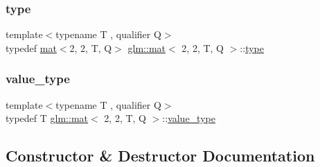 \mbox{\label{structglm_1_1mat_3_012_00_012_00_01_t_00_01_q_01_4_ac6dc94bb53f4e93c806d3b38cbf9172c}} 
\subsubsection{\texorpdfstring{type}{type}}
{\footnotesize\ttfamily template$<$typename T , qualifier Q$>$ \\
typedef \mbox{\hyperlink{structglm_1_1mat}{mat}}$<$2, 2, T, Q$>$ \mbox{\hyperlink{structglm_1_1mat}{glm\+::mat}}$<$ 2, 2, T, Q $>$\+::\mbox{\hyperlink{structglm_1_1mat_3_012_00_012_00_01_t_00_01_q_01_4_ac6dc94bb53f4e93c806d3b38cbf9172c}{type}}}

\mbox{\label{structglm_1_1mat_3_012_00_012_00_01_t_00_01_q_01_4_a6bd6b4c0d4bf7dff724cc03096b92d40}} 
\subsubsection{\texorpdfstring{value\+\_\+type}{value\_type}}
{\footnotesize\ttfamily template$<$typename T , qualifier Q$>$ \\
typedef T \mbox{\hyperlink{structglm_1_1mat}{glm\+::mat}}$<$ 2, 2, T, Q $>$\+::\mbox{\hyperlink{structglm_1_1mat_3_012_00_012_00_01_t_00_01_q_01_4_a6bd6b4c0d4bf7dff724cc03096b92d40}{value\+\_\+type}}}



\subsection{Constructor \& Destructor Documentation}
\mbox{\label{structglm_1_1mat_3_012_00_012_00_01_t_00_01_q_01_4_a8601499ee4cd49be39e8497bbef84d91}} 
